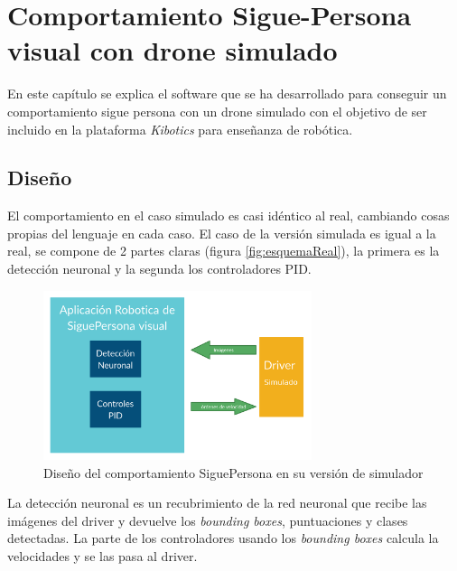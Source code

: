 \chapter{Comportamiento Sigue-Persona visual con drone simulado}\label{cap.simulado}
En este capítulo se explica el software que se ha desarrollado para conseguir un comportamiento sigue persona con un drone simulado con el objetivo de ser incluido en la plataforma \textit{Kibotics} para enseñanza de robótica.

\section{Diseño}
El comportamiento en el caso simulado es casi idéntico al real, cambiando cosas propias del lenguaje en cada caso. El caso de la versión simulada es igual a la real, se compone de 2 partes claras (figura \ref{fig:esquemaReal}), la primera es la detección neuronal y la segunda los controladores PID.
\begin{figure}[H]
  \begin{center}
    \includegraphics[width=0.7\textwidth]{figures/simulado/esquema.png}
		\caption{Diseño del comportamiento SiguePersona en su versión de simulador}
		\label{fig:esquemaSim}
		\end{center}
\end{figure}

La detección neuronal es un recubrimiento de la red neuronal que recibe las imágenes del driver y devuelve los \textit{bounding boxes}, puntuaciones y clases detectadas. 
La parte de los controladores usando los \textit{bounding boxes} calcula la velocidades y se las pasa al driver.
